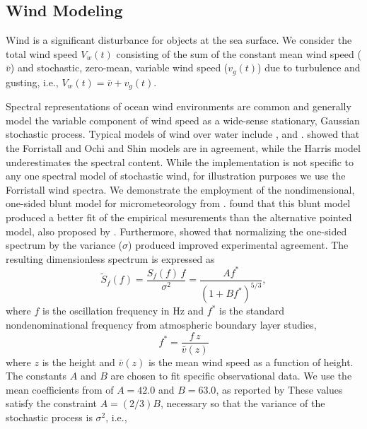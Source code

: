 \documentclass[utf8]{frontiersSCNS} %
\begin{document}
\subsection{Wind Modeling}\label{s:wind_model}
Wind is a significant disturbance for objects at the sea surface. We consider the total wind speed $V_w(t)$ consisting of the sum of the constant mean wind speed ($\bar{v}$) and stochastic, zero-mean, variable wind speed ($v_g(t)$) due to turbulence and gusting, i.e., $V_w(t)=\bar{v}+v_g(t)$.

Spectral representations of ocean wind environments are common and generally model the variable component of wind speed as a wide-sense stationary, Gaussian stochastic process.  Typical models of wind over water include \citet{harris71nature}, \citet{forristall88wind} and \citet{ochi13wind}. \citet{cole18reactive} showed that the Forristall and Ochi and Shin models are in agreement, while the Harris model underestimates the spectral content.  While the implementation is not specific to any one spectral model of stochastic wind, for illustration purposes we use the Forristall wind spectra.  \color{blue}We demonstrate the employment of the nondimensional, one-sided blunt model for micrometeorology from \citet{olesen84modelling}.  \citet{forristall88wind} found that this blunt model produced a better fit of the empirical mesurements than the alternative pointed model, also proposed by \citet{olesen84modelling}.  Furthermore, \citet{forristall88wind} showed that normalizing the one-sided spectrum by the variance ($\sigma$) produced improved experimental agreement.  The resulting dimensionless spectrum is expressed as 
\begin{equation}
  \widetilde{S}_f(f) = \frac{S_f(f)\,f}{\sigma^2}  = \frac{ A f^*}{( 1 + B f^*)^{5/3}},
    \label{e:forristall}
    \end{equation}
    \color{black}where $f$ is the oscillation frequency in \unit[]{Hz} and $f^*$ is the standard nondenominational frequency from atmospheric boundary layer studies,
\begin{equation}
  f^* = \frac{f \, z}{\bar{v}(z)}
\end{equation}
where $z$ is the height and $\bar{v}(z)$ is the mean wind speed as a function of height. The constants $A$ and $B$ are chosen to fit specific observational data.  We use the mean coefficients from of $A=42.0$ and $B=63.0$, as reported by \citet{forristall88wind}  These values satisfy the constraint $A=(2/3)B$, necessary so that the variance of the stochastic process is $\sigma^2$, i.e.,
\end{document}
